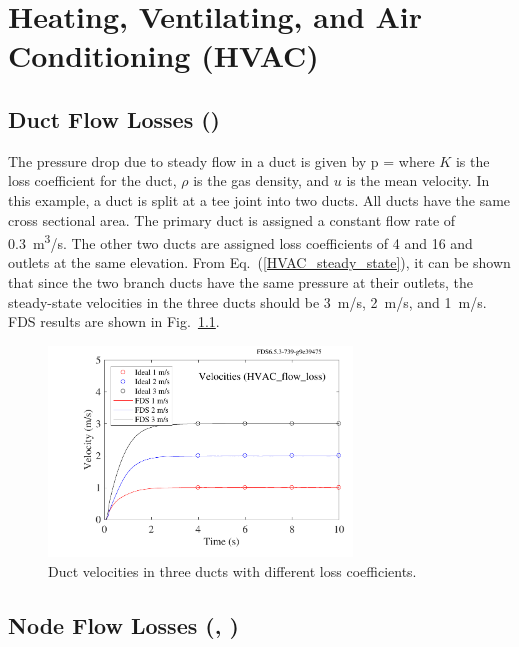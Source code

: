 \documentclass[11pt]{book}
\begin{document}
\chapter{Heating, Ventilating, and Air Conditioning (HVAC)}

\section{Duct Flow Losses (\texorpdfstring{}{HVAC\_flow\_loss})}
\label{HVAC_flow_loss}

The pressure drop due to steady flow in a duct is given by
\be
\Delta p =   \label {HVAC_steady_state}
\ee
where $K$ is the loss coefficient for the duct, $\rho$ is the gas density, and $u$ is the mean velocity. In this example, a duct is split at a tee joint into two ducts. All ducts have the same cross sectional area.  The primary duct is assigned a constant flow rate of 0.3~\si{m^3/s}.  The other two ducts are assigned loss coefficients of 4 and 16 and outlets at the same elevation.  From Eq.~(\ref{HVAC_steady_state}), it can be shown that since the two branch ducts have the same pressure at their outlets, the steady-state velocities in the three ducts should be 3~m/s, 2~m/s, and 1~m/s.  FDS results are shown in Fig.~\ref{fig_HVAC_loss}.

\begin{figure}[ht]
\centering
\includegraphics[height=2.2in]{SCRIPT_FIGURES/HVAC_flow_loss}
\caption[The  test case]{Duct velocities in three ducts with different loss coefficients.}
\label{fig_HVAC_loss}
\end{figure}


\section{Node Flow Losses (\texorpdfstring{}{HVAC\_tee\_loss\_1}, \texorpdfstring{}{HVAC\_tee\_loss\_2})}
\label{HVAC_tee_loss_1}
\label{HVAC_tee_loss_2}
\end{document}
